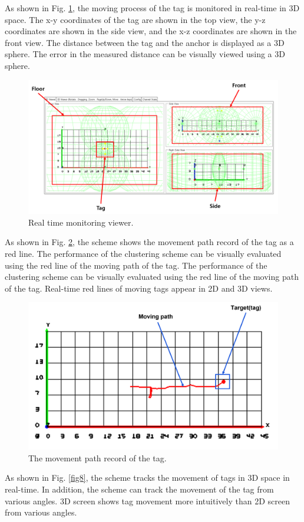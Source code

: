 \documentclass[conference]{IEEEtran}
\begin{document}
As shown in Fig. \ref{fig6}, the moving process of the tag is monitored in real-time in 3D space. The x-y coordinates of the tag are shown in the top view, the y-z coordinates are shown in the side view, and the x-z coordinates are shown in the front view. The distance between the tag and the anchor is displayed as a 3D sphere. The error in the measured distance can be visually viewed using a 3D sphere.

\begin{figure}[htbp]
\centerline{\includegraphics[width=0.62\columnwidth]{fig6.png}}
\caption{Real time monitoring viewer.}
\label{fig6}
\end{figure}

As shown in Fig. \ref{fig7}, the scheme shows the movement path record of the tag as a red line. The performance of the clustering scheme can be visually evaluated using the red line of the moving path of the tag. The performance of the clustering scheme can be visually evaluated using the red line of the moving path of the tag. Real-time red lines of moving tags appear in 2D and 3D views.

\begin{figure}[htbp]
\centerline{\includegraphics[width=0.62\columnwidth]{fig7.png}}
\caption{The movement path record of the tag.}
\label{fig7}
\end{figure}

As shown in Fig. \ref{fig8}, the scheme tracks the movement of tags in 3D space in real-time. In addition, the scheme can track the movement of the tag from various angles. 3D screen shows tag movement more intuitively than 2D screen from various angles.
\end{document}
